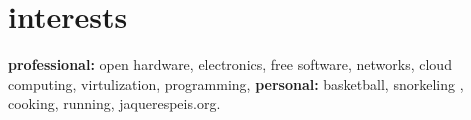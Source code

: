 \documentclass[]{friggeri-cv} %
\begin{document}
%


\section{interests}

\textbf{professional:} open hardware, electronics, free software, networks, cloud computing, virtulization, programming, \textbf{personal:} basketball, snorkeling , cooking, running, jaquerespeis.org.

%
%
%
%
%
%
%
%
\end{document}
